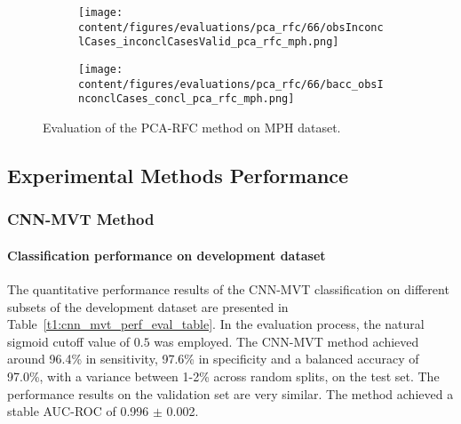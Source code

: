 \begin{figure}[ht]
  \begin{subfigure}{0.49\textwidth}
    \centering
    \texttt{[image: content/figures/evaluations/pca\_rfc/66/obsInconclCases\_inconclCasesValid\_pca\_rfc\_mph.png]}
    \label{fig:obsInconclCases_inconclCasesValid_pca_rfc_mph}
  \end{subfigure}
  \hfill
  \begin{subfigure}{0.49\textwidth}
    \centering
    \texttt{[image: content/figures/evaluations/pca\_rfc/66/bacc\_obsInconclCases\_concl\_pca\_rfc\_mph.png]}
    \label{fig:bacc_obsInconclCases_concl_pca_rfc_mph}
  \end{subfigure}
  \caption{Evaluation of the PCA-RFC method on MPH dataset.}
  \label{fig:perf_results_rfc_mph}
\end{figure}


\subsection{Experimental Methods Performance}
\label{subsec:exp_methods_perf}

\subsubsection{CNN-MVT Method}
\label{subsubsec:eval_mvt}


\paragraph{Classification performance on development dataset}

The quantitative performance results of the CNN-MVT classification on 
different subsets of the development dataset are presented in Table~\ref{t1:cnn_mvt_perf_eval_table}.
In the evaluation process, the natural sigmoid cutoff value of $0.5$ was employed.
The CNN-MVT method achieved around 96.4\% in sensitivity, 97.6\% in specificity and a balanced accuracy of 97.0\%, 
with a variance between 1-2\% across random splits, on the test set.
The performance results on the validation set are very similar.
The method achieved a stable AUC-ROC of 0.996 $\pm$ 0.002.


